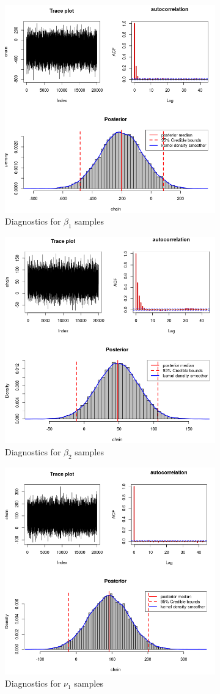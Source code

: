 \documentclass[11pt,twoside]{report}
\begin{document}
\begin{figure}[H]
	\begin{subfigure}[H]{0.50\linewidth}
		\centering
		\includegraphics[width=58 mm]{pictures/beta_1_2.png}
		\caption{Diagnostics for $ \beta_1 $ samples}
		\label{fig:beta_1_2}
	\end{subfigure}
	\hfill
	\begin{subfigure}[H]{0.50\linewidth}
		\centering
		\includegraphics[width=58 mm]{pictures/beta_2_2.png}
		\caption{Diagnostics for $ \beta_2 $ samples}
		\label{fig:beta_2_2}
	\end{subfigure}%
	\vfill
	\begin{subfigure}[H]{0.50\linewidth}
		\centering
		\includegraphics[width=58 mm]{pictures/nu_1_2.png}
		\caption{Diagnostics for $ \nu_1 $ samples}
		\label{fig:nu_1_2}
	\end{subfigure}
	\hfill
	\begin{subfigure}[H]{0.50\linewidth}

\end{subfigure}
\end{figure}
\end{document}
